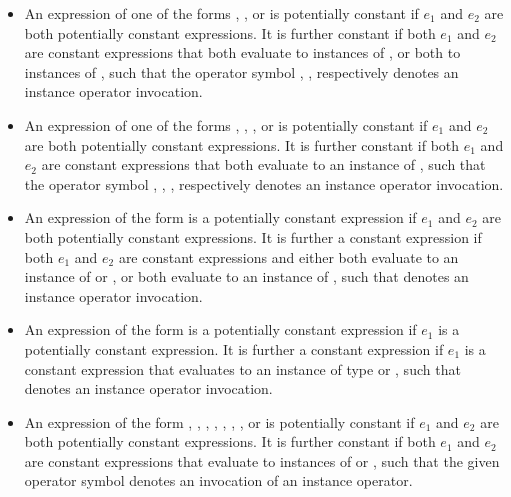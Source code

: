 \documentclass[makeidx]{article}
\begin{document}
{\begin{itemize}
\item An expression of one of the forms ,
  , or  is potentially constant
  if $e_1$ and $e_2$ are both potentially constant expressions.
  It is further constant if both $e_1$ and $e_2$ are constant expressions that
  both evaluate to instances of ,
  or both to instances of ,
  such that the operator symbol
  \lit{\&}, \lit{|}, respectively \lit{\^}
  denotes an instance operator invocation.

\item An expression of one of the forms ,
  , ,
  or  is potentially constant
  if $e_1$ and $e_2$ are both potentially constant expressions.
  It is further constant if both $e_1$ and $e_2$ are constant expressions that
  both evaluate to an instance of ,
  such that the operator symbol
  \lit{\gtilde/}, \lit{\gtgt}, \lit{\gtgtgt}, respectively \lit{\ltlt}
  denotes an instance operator invocation.

\item An expression of the form  is
  a potentially constant expression if $e_1$ and $e_2$
  are both potentially constant expressions.
  It is further a constant expression
  if both $e_1$ and $e_2$ are constant expressions
  and either both evaluate to an instance of  or ,
  or both evaluate to an instance of ,
  such that \lit{+} denotes an instance operator invocation.

\item
  An expression of the form  is a potentially constant expression
  if $e_1$ is a potentially constant expression.
  It is further a constant expression if $e_1$ is a constant expression that
  evaluates to an instance of type  or ,
  such that \lit{-} denotes an instance operator invocation.

\item An expression of the form , ,
  , , ,
  , , or 
  is potentially constant
  if $e_1$ and $e_2$ are both potentially constant expressions.
  It is further constant if both $e_1$ and $e_2$ are constant expressions that
  evaluate to instances of  or ,
  such that the given operator symbol denotes
  an invocation of an instance operator.


\end{itemize}}
\end{document}
